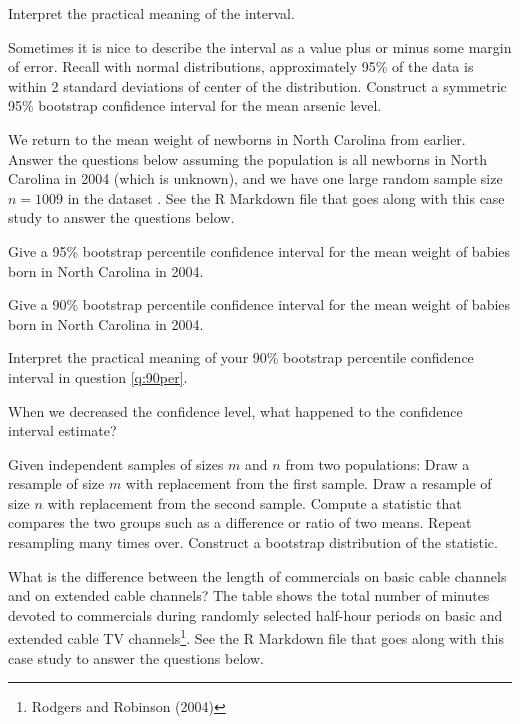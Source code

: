 \ii Interpret the practical meaning of the interval. \vfill

\ii Sometimes it is nice to describe the interval as a value plus or minus some margin of error. Recall with normal distributions, approximately 95\% of the data is within 2 standard deviations of center of the distribution.  Construct a symmetric 95\% bootstrap confidence interval for the mean arsenic level.  \vfill
\ee

\clearpage

\ii We return to the mean weight of newborns in North Carolina from earlier. Answer the questions below assuming the population is all newborns in North Carolina in 2004 (which is unknown), and we have one large random sample size $n=1009$ in the dataset \textit{\textbf{}}. See the R Markdown file that goes along with this case study to answer the questions below.

\bb
\ii Give a 95\% bootstrap percentile confidence interval for the mean weight of babies born in North Carolina in 2004.\vfill %

\ii Give a 90\% bootstrap percentile confidence interval for the mean weight of babies born in North Carolina in 2004. \label{q:90per} \vfill

\ii Interpret the practical meaning of your 90\% bootstrap percentile confidence interval in question \ref{q:90per}. \vfill

\ii When we decreased the confidence level, what happened to the confidence interval estimate? \vfill
\ee
\ee


\clearpage


\bbox
Given independent samples of sizes $m$ and $n$ from two populations:
\bi
\ii Draw a resample of size $m$ with replacement from the first sample.
\ii Draw a resample of size $n$ with replacement from the second sample.
\ii Compute a statistic that compares the two groups such as a difference or ratio of two means.
\ii Repeat resampling many times over.
\ii Construct a bootstrap distribution of the statistic.
\ei
\ebox

\bb[resume]
\ii What is the difference between the length of commercials on basic cable channels and on extended cable channels? The table
shows the total number of minutes devoted to commercials during randomly selected half-hour periods on basic and extended cable TV channels\footnote{Rodgers and Robinson (2004)}. See the R Markdown file that goes along with this case study to answer the questions below.


